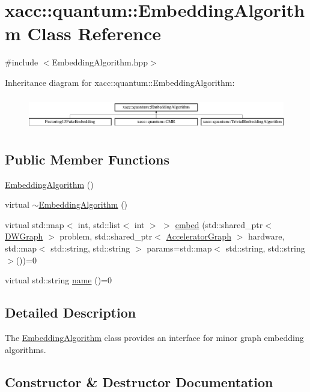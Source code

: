 \hypertarget{a00052}{}\section{xacc\+:\+:quantum\+:\+:Embedding\+Algorithm Class Reference}
\label{a00052}


{\ttfamily \#include $<$Embedding\+Algorithm.\+hpp$>$}

Inheritance diagram for xacc\+:\+:quantum\+:\+:Embedding\+Algorithm\+:\begin{figure}[H]
\begin{center}
\leavevmode
\includegraphics[height=1.464052cm]{a00052}
\end{center}
\end{figure}
\subsection*{Public Member Functions}
\begin{DoxyCompactItemize}
\item 
\hyperlink{a00052_abad06507eef6b63af0884e3a96145c69}{Embedding\+Algorithm} ()
\item 
virtual \hyperlink{a00052_aa43660ad5d4c4b3ac67863892c33dc51}{$\sim$\+Embedding\+Algorithm} ()
\item 
virtual std\+::map$<$ int, std\+::list$<$ int $>$ $>$ \hyperlink{a00052_a6fca277e217884ff79802770189276fe}{embed} (std\+::shared\+\_\+ptr$<$ \hyperlink{a00043}{D\+W\+Graph} $>$ problem, std\+::shared\+\_\+ptr$<$ \hyperlink{a00064}{Accelerator\+Graph} $>$ hardware, std\+::map$<$ std\+::string, std\+::string $>$ params=std\+::map$<$ std\+::string, std\+::string $>$())=0
\item 
virtual std\+::string \hyperlink{a00052_a21079dc8ee37792977f5fd209e3f3b19}{name} ()=0
\end{DoxyCompactItemize}


\subsection{Detailed Description}
The \hyperlink{a00052}{Embedding\+Algorithm} class provides an interface for minor graph embedding algorithms. 

\subsection{Constructor \& Destructor Documentation}
